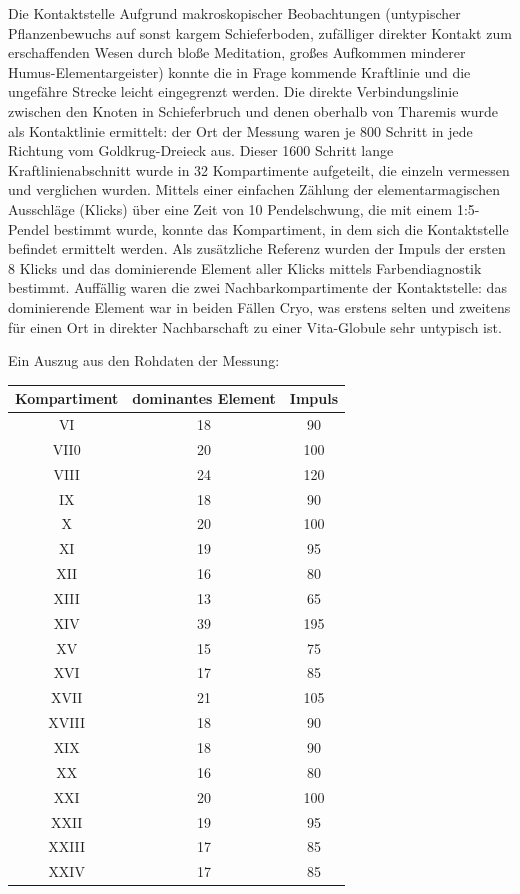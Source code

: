 \documentclass[a5paper,8pt]{book}
\begin{document}
Die Kontaktstelle 
Aufgrund makroskopischer Beobachtungen (untypischer Pflanzenbewuchs auf sonst kargem Schieferboden, zufälliger direkter 
Kontakt zum erschaffenden Wesen durch bloße Meditation, großes Aufkommen minderer Humus-Elementargeister) konnte die in 
Frage kommende Kraftlinie und die ungefähre Strecke leicht eingegrenzt werden. Die direkte Verbindungslinie zwischen den 
Knoten in Schieferbruch und denen oberhalb von Tharemis wurde als Kontaktlinie ermittelt: der Ort der Messung waren je 800 
Schritt in jede Richtung vom Goldkrug-Dreieck aus. Dieser 1600 Schritt lange Kraftlinienabschnitt wurde in 32 Kompartimente 
aufgeteilt, die einzeln vermessen und verglichen wurden. Mittels einer einfachen Zählung der elementarmagischen Ausschläge 
(Klicks) über eine Zeit von 10 Pendelschwung, die mit einem 1:5-Pendel bestimmt wurde, konnte das Kompartiment, in dem sich 
die Kontaktstelle befindet ermittelt werden.
Als zusätzliche Referenz wurden der Impuls der ersten 8 Klicks und das dominierende Element aller Klicks mittels 
Farbendiagnostik bestimmt. Auffällig waren die zwei Nachbarkompartimente der Kontaktstelle: das dominierende Element war 
in beiden Fällen Cryo, was erstens selten und zweitens für einen Ort in direkter Nachbarschaft zu einer Vita-Globule sehr 
untypisch ist. 


Ein Auszug aus den Rohdaten der Messung:

\begin{table}[htbp]
\begin{center}
\begin{tabular}{|c|c|c|}
\hline
Kompartiment	&dominantes Element	&Impuls	\\
\hline
VI	&18	&90	\\
VII0	&20	&100	\\
VIII	&24	&120	\\
IX	&18	&90	\\
X	&20	&100	\\
XI	&19	&95	\\
XII	&16	&80	\\
XIII	&13	&65	\\
XIV	&39	&195	\\
XV	&15	&75	\\
XVI	&17	&85	\\
XVII	&21	&105	\\
XVIII	&18	&90	\\
XIX	&18	&90	\\
XX	&16	&80	\\
XXI	&20	&100	\\
XXII	&19	&95	\\
XXIII	&17	&85	\\
XXIV	&17	&85	\\
\hline
\end{tabular}
\label{Winkel der hochsymmetrischen Achsen zu (111)}
\end{center}
\end{table}
\end{document}
